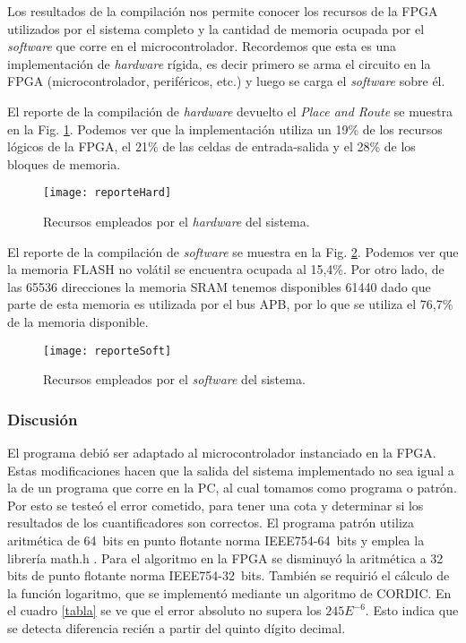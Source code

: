 Los resultados de la compilación nos permite conocer los recursos de la FPGA utilizados por el sistema completo y la cantidad de memoria ocupada por el \textit{software} que corre en el microcontrolador.
Recordemos que esta es una implementación de \textit{hardware} rígida, es decir primero se arma el circuito en la FPGA (microcontrolador, periféricos, etc.) y luego se carga el \textit{software} sobre él.

El reporte de la compilación de \textit{hardware} devuelto el \textit{Place and Route} se muestra en la Fig. \ref{fig:hard}. Podemos ver que la implementación utiliza un 19\% de los recursos lógicos de la FPGA, el 21\% de las celdas de entrada-salida y el 28\% de los bloques de memoria.
%
\begin{figure}[htb]
	\centering\texttt{[image: reporteHard]}
	\caption{Recursos empleados por el \textit{hardware} del sistema.}\label{fig:hard}
\end{figure}

El reporte de la compilación de \textit{software} se muestra en la Fig. \ref{fig:soft}.
Podemos ver que la memoria FLASH no volátil se encuentra ocupada al 15,4\%.
Por otro lado, de las 65536 direcciones la memoria SRAM tenemos disponibles 61440 dado que parte de esta memoria es utilizada por el bus APB, por lo que se utiliza el 76,7\% de la memoria disponible.
%
\begin{figure}[htb]
	\centering\texttt{[image: reporteSoft]}
	\caption{Recursos empleados por el \textit{software} del sistema.}\label{fig:soft}
\end{figure}

\subsubsection{Discusión}
\label{sec:discusion}

El programa debió ser adaptado al microcontrolador instanciado en la FPGA.
Estas modificaciones hacen que la salida del sistema implementado no sea igual a la de un programa que corre en la PC, al cual tomamos como programa o patrón.
Por esto se testeó el error cometido, para tener una cota y determinar si los resultados de los cuantificadores son correctos.
El programa patrón utiliza aritmética de 64~bits en punto flotante norma IEEE754-64~bits y emplea la librería math.h \cite{Mathe}.
Para el algoritmo en la FPGA se disminuyó la aritmética a 32 bits de punto flotante norma IEEE754-32~bits.
También se requirió el cálculo de la función logaritmo, que se implementó mediante un algoritmo de CORDIC.
En el cuadro \ref{tabla} se ve que el error absoluto no supera los $245E^{-6}$. Esto indica que se detecta diferencia recién a partir del quinto dígito decimal.

